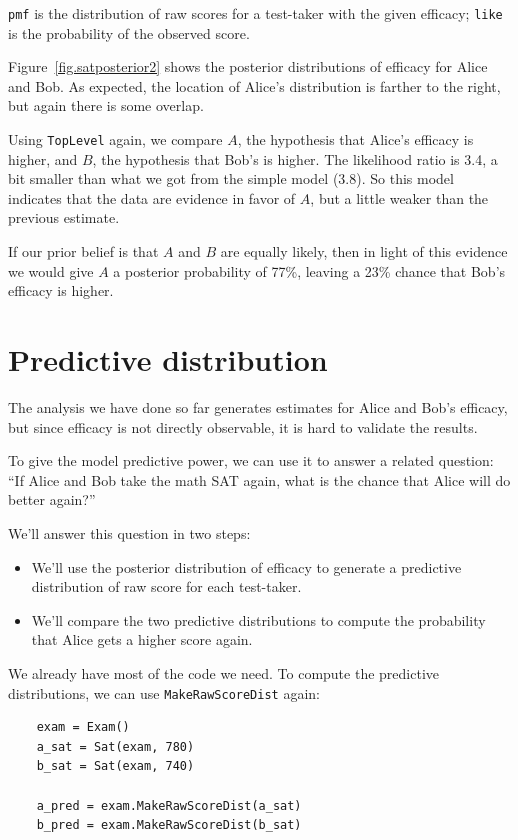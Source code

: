 \documentclass[12pt]{book}
\begin{document}
{\tt pmf} is the distribution of raw scores for a test-taker
with the given efficacy; {\tt like} is the probability of
the observed score.

Figure~\ref{fig.satposterior2} shows the posterior distributions
of efficacy for Alice and Bob.  As expected, the location
of Alice's distribution is farther to the right, but again there
is some overlap.

Using {\tt TopLevel} again, we compare $A$, the
hypothesis that Alice's efficacy is higher, and $B$, the
hypothesis that Bob's is higher.  The likelihood ratio is
3.4, a bit smaller than what we got from the simple model (3.8).
So this model indicates that the data are evidence in favor
of $A$, but a little weaker than the previous estimate.

If our prior belief is that $A$ and $B$ are equally likely,
then in light of this evidence we would give $A$ a posterior
probability of 77\%, leaving a 23\% chance that Bob's efficacy
is higher.


\section{Predictive distribution}

The analysis we have done so far generates estimates for
Alice and Bob's efficacy, but since efficacy is not directly
observable, it is hard to validate the results.

To give the model predictive power, we can use it to answer
a related question: ``If Alice and Bob take the math SAT
again, what is the chance that Alice will do better again?''

We'll answer this question in two steps:

\begin{itemize}

\item We'll use the posterior distribution of efficacy to
generate a predictive distribution of raw score for each test-taker.

\item We'll compare the two predictive distributions to compute
the probability that Alice gets a higher score again.

\end{itemize}

We already have most of the code we need.  To compute
the predictive distributions, we can use \verb"MakeRawScoreDist" again:

\begin{verbatim}
    exam = Exam()
    a_sat = Sat(exam, 780)
    b_sat = Sat(exam, 740)

    a_pred = exam.MakeRawScoreDist(a_sat)
    b_pred = exam.MakeRawScoreDist(b_sat)
\end{verbatim}
\end{document}
